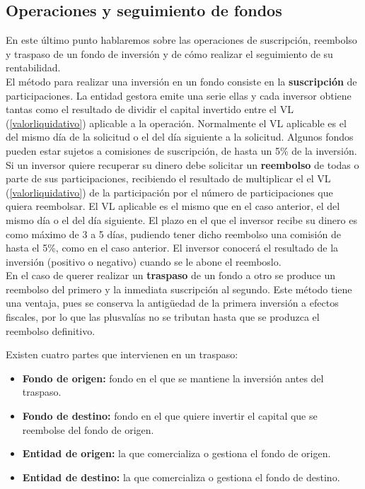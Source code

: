 \documentclass[12pt, a4paper]{book}
\begin{document}
 \subsection{Operaciones y seguimiento de fondos}

En este último punto hablaremos sobre las operaciones de suscripción, reembolso y traspaso de un fondo de inversión y de cómo realizar el seguimiento de su rentabilidad.\\

El método para realizar una inversión en un fondo consiste en la \textbf{suscripción} de participaciones. La entidad gestora emite una serie ellas y cada inversor obtiene tantas como el resultado de dividir el capital invertido entre el \gls{VL} (\ref{valorliquidativo}) aplicable a la operación. Normalmente el \gls{VL} aplicable es el del mismo día de la solicitud o el del día siguiente a la solicitud. Algunos fondos pueden estar sujetos a comisiones de suscripción, de hasta un 5\% de la inversión.\\

Si un inversor quiere recuperar su dinero debe solicitar un \textbf{reembolso} de todas o parte de sus participaciones, recibiendo el resultado de multiplicar el el \gls{VL} (\ref{valorliquidativo}) de la participación por el número de participaciones que quiera reembolsar. El \gls{VL} aplicable es el mismo que en el caso anterior, el del mismo día o el del día siguiente. 
El plazo en el que el inversor recibe su dinero es como máximo de 3 a 5 días, pudiendo tener dicho reembolso una comisión de hasta el 5\%, como en el caso anterior. El inversor conocerá el resultado de la inversión (positivo o negativo) cuando se le abone el reemboslo.\\

En el caso de querer realizar un \textbf{traspaso} de un fondo a otro se produce un reembolso del primero y la inmediata suscripción al segundo. Este método tiene una ventaja, pues se conserva la antigüedad de la primera inversión a efectos fiscales, por lo que las plusvalías no se tributan hasta que se produzca el reembolso definitivo.\\

\newpage

Existen cuatro partes que intervienen en un traspaso:

\begin{itemize}
	\item \textbf{Fondo de origen:} fondo en el que se mantiene la inversión antes del traspaso.
	\item \textbf{Fondo de destino:} fondo en el que quiere invertir el capital que se reembolse del fondo de origen.
	\item \textbf{Entidad de origen:} la que comercializa o gestiona el fondo de origen.
	\item \textbf{Entidad de destino:} la que comercializa o gestiona el fondo de destino.
\end{itemize}
\end{document}
